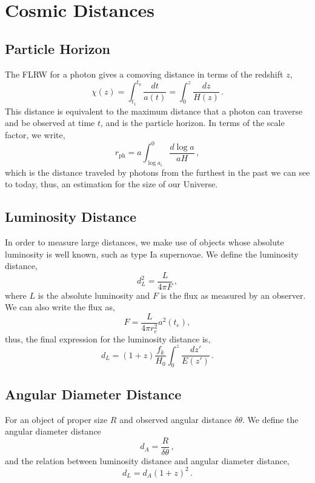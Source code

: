 \documentclass{book}
\begin{document}
	\section{Cosmic Distances}
	\subsection*{Particle Horizon}
	The FLRW for a photon gives a comoving distance in terms of the redshift $z$,
	\begin{equation}
		\label{comoving_horizon}
		\chi(z)=\int_{t_1}^{t_0}\frac{dt}{a(t)}=\int_{0}^{z}\frac{dz}{H(z)} \, .
	\end{equation}
	This distance is equivalent to the maximum distance that a photon can traverse and be observed at time $t$, and is the particle horizon. In terms of the scale factor, we write,
	\begin{equation}
		\label{particle_horizon}
		r_\text{ph}=a\int_{\log a_i}^{0} \frac{d\log a}{aH} \, ,
	\end{equation}
	which is the distance traveled by photons from the furthest in the past we can see to today, thus, an estimation for the size of our Universe.
	\subsection*{Luminosity Distance}
	In order to measure large distances, we make use of objects whose absolute luminosity is well known, such as type Ia supernovae. We define the luminosity distance,
	\begin{equation}
		\label{luminosity_distance}
		d^2_L=\frac{L}{4\pi F} \, ,
	\end{equation}
	where $L$ is the absolute luminosity and $F$ is the flux as measured by an observer. We can also write the flux as,
	\begin{equation*}
		F=\frac{L}{4\pi r_e^2} a^2(t_e),
	\end{equation*}
	thus, the final expression for the luminosity distance is,
	\begin{equation}
		\label{lummiosity_distance_full}
		d_L=(1+z)\frac{f_k}{H_0}\int_{0}^{z}\frac{dz'}{E(z')} \, .
	\end{equation}
	\subsection*{Angular Diameter Distance}
	For an object of proper size $R$ and observed angular distance $\delta\theta$. We define the angular diameter distance
	\begin{equation}
		\label{diameter_distance}
		d_A=\frac{R}{\delta\theta} \, ,
	\end{equation}
	and the relation between luminosity distance and angular diameter distance,
	\begin{equation}
		\label{luminosity_angular}
		d_L=d_A (1+z)^2 \, .
	\end{equation}
\end{document}
